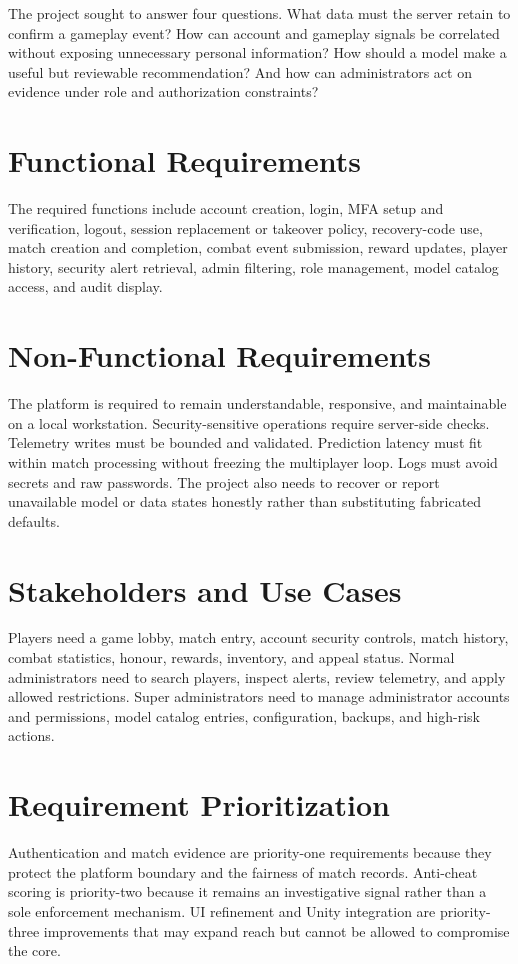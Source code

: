 \documentclass[12pt,a4paper,oneside]{report}
\begin{document}
The project sought to answer four questions. What data must the server retain to confirm a gameplay event? How can account and gameplay signals be correlated without exposing unnecessary personal information? How should a model make a useful but reviewable recommendation? And how can administrators act on evidence under role and authorization constraints?

\section{Functional Requirements}
The required functions include account creation, login, MFA setup and verification, logout, session replacement or takeover policy, recovery-code use, match creation and completion, combat event submission, reward updates, player history, security alert retrieval, admin filtering, role management, model catalog access, and audit display.

\section{Non-Functional Requirements}
The platform is required to remain understandable, responsive, and maintainable on a local workstation. Security-sensitive operations require server-side checks. Telemetry writes must be bounded and validated. Prediction latency must fit within match processing without freezing the multiplayer loop. Logs must avoid secrets and raw passwords. The project also needs to recover or report unavailable model or data states honestly rather than substituting fabricated defaults.

\section{Stakeholders and Use Cases}
Players need a game lobby, match entry, account security controls, match history, combat statistics, honour, rewards, inventory, and appeal status. Normal administrators need to search players, inspect alerts, review telemetry, and apply allowed restrictions. Super administrators need to manage administrator accounts and permissions, model catalog entries, configuration, backups, and high-risk actions.

\section{Requirement Prioritization}
Authentication and match evidence are priority-one requirements because they protect the platform boundary and the fairness of match records. Anti-cheat scoring is priority-two because it remains an investigative signal rather than a sole enforcement mechanism. UI refinement and Unity integration are priority-three improvements that may expand reach but cannot be allowed to compromise the core.
\end{document}
